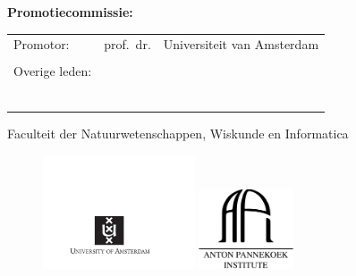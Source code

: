 \clearpage



{\bf\normalsize Promotiecommissie:} \\[0.2cm]

\begin{tabular}{@{}lll}
     Promotor:      & prof.~dr.   & Universiteit van Amsterdam\\
					&									&	                         \\
	Overige leden:	&  & \\
                    &  & \\
                    &  & \\
                    &  & \\
                         
                    &  & \\
                    &  & \\
                    &  &

\end{tabular} 

\vspace*{0.2cm}
Faculteit der Natuurwetenschappen, Wiskunde en Informatica

\vspace*{\fill}

\begin{figure}[!h]
\includegraphics[width=0.4\textwidth]{gfx/titlepage/UvA_logo.pdf}
\hspace{4cm}
\includegraphics[width=0.25\textwidth]{gfx/titlepage/API_logo.pdf}
\end{figure}

